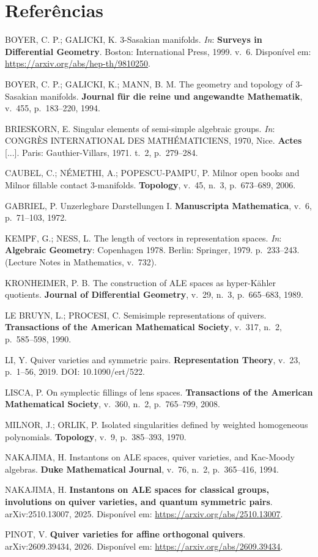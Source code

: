 \documentclass[11pt]{article}
\theoremstyle{definition}
\theoremstyle{remark}
\begin{document}
\section*{Referências}
\begingroup\small\setlength{\parindent}{0pt}\setlength{\parskip}{5pt}\raggedright

BOYER, C. P.; GALICKI, K. 3-Sasakian manifolds. \textit{In}: \textbf{Surveys in Differential Geometry}. Boston: International Press, 1999. v.~6. Disponível em: \url{https://arxiv.org/abs/hep-th/9810250}.

BOYER, C. P.; GALICKI, K.; MANN, B. M. The geometry and topology of 3-Sasakian manifolds. \textbf{Journal für die reine und angewandte Mathematik}, v.~455, p.~183--220, 1994.

BRIESKORN, E. Singular elements of semi-simple algebraic groups. \textit{In}: CONGRÈS INTERNATIONAL DES MATHÉMATICIENS, 1970, Nice. \textbf{Actes} [...]. Paris: Gauthier-Villars, 1971. t.~2, p.~279--284.

CAUBEL, C.; NÉMETHI, A.; POPESCU-PAMPU, P. Milnor open books and Milnor fillable contact 3-manifolds. \textbf{Topology}, v.~45, n.~3, p.~673--689, 2006.

GABRIEL, P. Unzerlegbare Darstellungen I. \textbf{Manuscripta Mathematica}, v.~6, p.~71--103, 1972.

KEMPF, G.; NESS, L. The length of vectors in representation spaces. \textit{In}: \textbf{Algebraic Geometry}: Copenhagen 1978. Berlin: Springer, 1979. p.~233--243. (Lecture Notes in Mathematics, v.~732).

KRONHEIMER, P. B. The construction of ALE spaces as hyper-Kähler quotients. \textbf{Journal of Differential Geometry}, v.~29, n.~3, p.~665--683, 1989.

LE BRUYN, L.; PROCESI, C. Semisimple representations of quivers. \textbf{Transactions of the American Mathematical Society}, v.~317, n.~2, p.~585--598, 1990.

LI, Y. Quiver varieties and symmetric pairs. \textbf{Representation Theory}, v.~23, p.~1--56, 2019. DOI: 10.1090/ert/522.

LISCA, P. On symplectic fillings of lens spaces. \textbf{Transactions of the American Mathematical Society}, v.~360, n.~2, p.~765--799, 2008.

MILNOR, J.; ORLIK, P. Isolated singularities defined by weighted homogeneous polynomials. \textbf{Topology}, v.~9, p.~385--393, 1970.

NAKAJIMA, H. Instantons on ALE spaces, quiver varieties, and Kac-Moody algebras. \textbf{Duke Mathematical Journal}, v.~76, n.~2, p.~365--416, 1994.

NAKAJIMA, H. \textbf{Instantons on ALE spaces for classical groups, involutions on quiver varieties, and quantum symmetric pairs}. arXiv:2510.13007, 2025. Disponível em: \url{https://arxiv.org/abs/2510.13007}.

PINOT, V. \textbf{Quiver varieties for affine orthogonal quivers}. arXiv:2609.39434, 2026. Disponível em: \url{https://arxiv.org/abs/2609.39434}.
\endgroup
\end{document}
